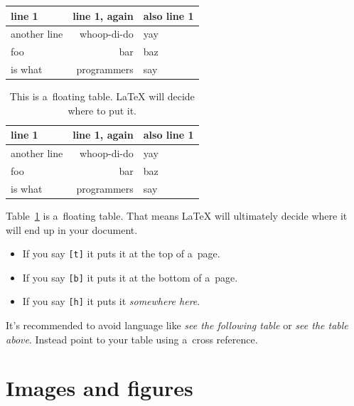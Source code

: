 \documentclass{scrartcl}
\begin{document}
\begin{center}
  \begin{tabular}{lrl}
    \toprule
    line 1 & line 1, again & also line 1 \\
    \midrule
    another line & whoop-di-do & yay \\
    foo & bar & baz \\
    is what & programmers & say \\
    \bottomrule
  \end{tabular}
\end{center}

\begin{table}[h]
  \centering%
  \begin{tabular}{lrl}
    \toprule
    line 1 & line 1, again & also line 1 \\
    \midrule
    another line & whoop-di-do & yay \\
    foo & bar & baz \\
    is what & programmers & say \\
    \bottomrule
  \end{tabular}
  \caption{This is a~floating table.  \LaTeX{} will decide where to put it.}
  \label{tab:my-table}
\end{table}

Table~\ref{tab:my-table} is a~floating table.
That means \LaTeX{} will ultimately decide where it will end up in your
document.

\begin{itemize}
  \item If you say \texttt{[t]} it puts it at the top of a~page.
  \item If you say \texttt{[b]} it puts it at the bottom of a~page.
  \item If you say \texttt{[h]} it puts it \emph{somewhere here}\texttrademark.
\end{itemize}

It's recommended to avoid language like \emph{see the following table} or
\emph{see the table above}.
Instead point to your table using a~cross reference.

\section{Images and figures}
\end{document}
